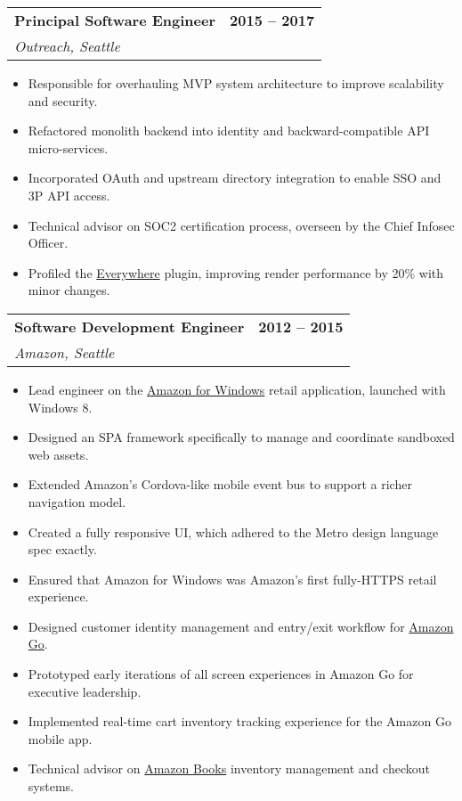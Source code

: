 \documentclass[12pt]{article}
\makeatletter
\newenvironment{justifycolumns}
{\begin{tabular*}{\textwidth}{@{\extracolsep{\fill}}lr@{}}}
{\end{tabular*}}
\newcommand{\row}[2]{#1 & #2 \\}
\newcommand{\rowheading}[2]{\row{\textbf{#1}}{\textbf{#2}}}
\newcommand{\range}[2]{#1 -- #2}
\newcommand{\blockseparation}{\vspace{0.13in}}
\newenvironment{tightbullets}
{\begin{itemize}}
{\end{itemize}}
\newenvironment{bullets}
{\begin{tightbullets}}
{\end{tightbullets} \blockseparation}
\makeatother
\begin{document}
\begin{flushleft}
\begin{justifycolumns}
	\rowheading{Principal Software Engineer}{\range{2015}{2017}}
	\row{\emph{Outreach, Seattle}}{}
\end{justifycolumns}
\begin{bullets}
	\item Responsible for overhauling MVP system architecture to improve scalability and security.
	\item Refactored monolith backend into identity and backward-compatible API micro-services.
	\item Incorporated OAuth and upstream directory integration to enable SSO and 3P API access.
	\item Technical advisor on SOC2 certification process, overseen by the Chief Infosec Officer.
	\item Profiled the \href{https://chrome.google.com/webstore/detail/outreach-everywhere/chmpifjjfpeodjljjadlobceoiflhdid}{Everywhere} plugin, improving render performance by 20\% with minor changes.
\end{bullets}

\begin{justifycolumns}
	\rowheading{Software Development Engineer}{\range{2012}{2015}}
	\row{\emph{Amazon, Seattle}}{}
\end{justifycolumns}
\begin{bullets}
	\item Lead engineer on the \href{http://apps.microsoft.com/windows/en-us/app/amazon/80299018-3dee-418d-8466-374fe9463309}{Amazon for Windows} retail application, launched with Windows 8.
	\item Designed an SPA framework specifically to manage and coordinate sandboxed web assets.
	\item Extended Amazon’s Cordova-like mobile event bus to support a richer navigation model.
	\item Created a fully responsive UI, which adhered to the Metro design language spec exactly.
	\item Ensured that Amazon for Windows was Amazon's first fully-HTTPS retail experience.
	\item Designed customer identity management and entry/exit workflow for \href{https://www.amazon.com/b?ie=UTF8\&node=16008589011}{Amazon Go}.
	\item Prototyped early iterations of all screen experiences in Amazon Go for executive leadership.
	\item Implemented real-time cart inventory tracking experience for the Amazon Go mobile app.
	\item Technical advisor on \href{https://www.amazon.com/amazon-books-university-village-seattle-washington/b?ie=UTF8\&node=17750359011}{Amazon Books} inventory management and checkout systems.
\end{bullets}


\end{flushleft}
\end{document}
